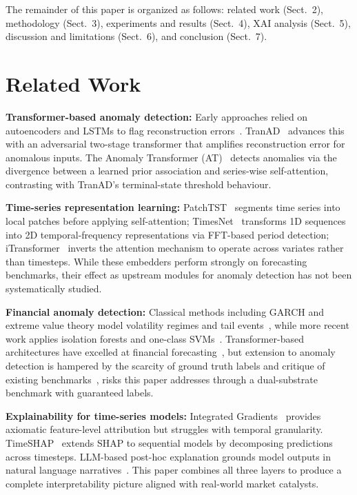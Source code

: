\documentclass{llncs}
\begin{document}
The remainder of this paper is organized as follows: related work (Sect.~2), methodology (Sect.~3), experiments and results (Sect.~4), XAI analysis (Sect.~5), discussion and limitations (Sect.~6), and conclusion (Sect.~7).

\section{Related Work}

\textbf{Transformer-based anomaly detection:} Early approaches relied on autoencoders and LSTMs to flag reconstruction errors~\cite{ref7,ref10}. TranAD~\cite{ref12} advances this with an adversarial two-stage transformer that amplifies reconstruction error for anomalous inputs. The Anomaly Transformer (AT)~\cite{ref15} detects anomalies via the divergence between a learned prior association and series-wise self-attention, contrasting with TranAD's terminal-state threshold behaviour.

\textbf{Time-series representation learning:} PatchTST~\cite{ref9} segments time series into local patches before applying self-attention; TimesNet~\cite{ref13} transforms 1D sequences into 2D temporal-frequency representations via FFT-based period detection; iTransformer~\cite{ref5} inverts the attention mechanism to operate across variates rather than timesteps. While these embedders perform strongly on forecasting benchmarks, their effect as upstream modules for anomaly detection has not been systematically studied.

\textbf{Financial anomaly detection:} Classical methods including GARCH and extreme value theory model volatility regimes and tail events~\cite{ref3,ref8}, while more recent work applies isolation forests and one-class SVMs~\cite{ref2,ref19}. Transformer-based architectures have excelled at financial forecasting~\cite{ref16}, but extension to anomaly detection is hampered by the scarcity of ground truth labels and critique of existing benchmarks~\cite{ref14,ref4},  risks this paper addresses through a dual-substrate benchmark with guaranteed labels.

\textbf{Explainability for time-series models:} Integrated Gradients~\cite{ref11} provides axiomatic feature-level attribution but struggles with temporal granularity. TimeSHAP~\cite{ref1} extends SHAP to sequential models by decomposing predictions across timesteps. LLM-based post-hoc explanation grounds model outputs in natural language narratives~\cite{ref17}. This paper combines all three layers to produce a complete interpretability picture aligned with real-world market catalysts.
\end{document}

